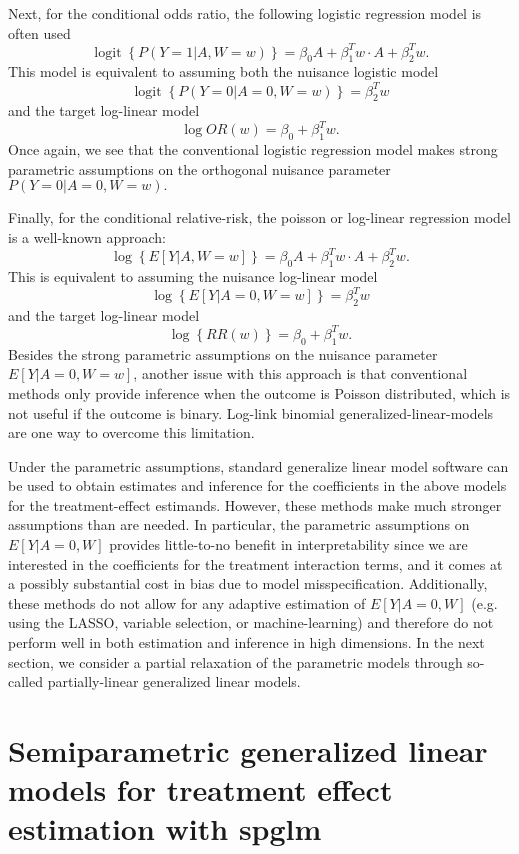 \documentclass{article}
\DeclareMathOperator{\logit}{logit}
\begin{document}
Next, for the conditional odds ratio, the following logistic regression model is often used
$$\logit \left\{P(Y=1|A,W=w) \right\} =  \beta_0 A +  \beta_1^T w \cdot A + \beta_2^T w.$$
This model is equivalent to assuming both the nuisance logistic model
$$\logit\left\{P(Y=0|A=0,W=w) \right\} =   \beta_2^T w$$
and the target log-linear model
$$\log OR(w) =  \beta_0  +  \beta_1^T w. $$
Once again, we see that the conventional logistic regression model makes strong parametric assumptions on the orthogonal nuisance parameter $P(Y=0|A=0,W=w).$ 

Finally, for the conditional relative-risk, the poisson or log-linear regression model is a well-known approach:
$$\log \left\{E[Y|A,W=w] \right\} =  \beta_0 A +  \beta_1^T w \cdot A + \beta_2^T w.$$
This is equivalent to assuming the nuisance log-linear model
$$\log \left\{E[Y|A=0,W=w] \right\} = \beta_2^T w$$
and the target log-linear model
$$\log \left\{RR(w) \right\} =  \beta_0  +  \beta_1^T w. $$
Besides the strong parametric assumptions on the nuisance parameter $E[Y|A=0,W=w]$, another issue with this approach is that conventional methods only provide inference when the outcome is Poisson distributed, which is not useful if the outcome is binary. Log-link binomial generalized-linear-models are one way to overcome this limitation. 

Under the parametric assumptions, standard generalize linear model software can be used to obtain estimates and inference for the coefficients in the above models for the treatment-effect estimands. However, these methods make much stronger assumptions than are needed. In particular, the parametric assumptions on $E[Y|A=0,W]$ provides little-to-no benefit in interpretability since we are interested in the coefficients for the treatment interaction terms, and it comes at a possibly substantial cost in bias due to model misspecification. Additionally, these methods do not allow for any adaptive estimation of $E[Y|A=0,W]$ (e.g. using the LASSO, variable selection, or machine-learning) and therefore do not perform well in both estimation and inference in high dimensions. In the next section, we consider a partial relaxation of the parametric models through so-called partially-linear generalized linear models.




\section{Semiparametric generalized linear models for treatment effect estimation  with spglm}
\end{document}
